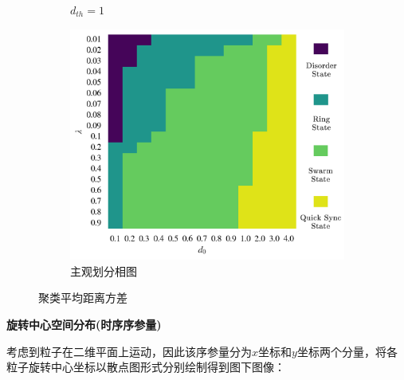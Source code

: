 \documentclass{article}
\begin{document}
\begin{figure}[H]
\begin{subfigure}[b]{0.49\textwidth}
		\vspace{-1cm}
		\caption{$d_{th}=1$}
	\end{subfigure}
	\begin{subfigure}[b]{0.49\textwidth}
		\includegraphics[width=\textwidth]{./figs/subjectiveOp.png}
		\vspace{-1cm}
		\caption{主观划分相图}
	\end{subfigure}

	\vspace{-0.5cm}
	\caption{聚类平均距离方差}
	\label{fig:fig234c.8}
\end{figure}

\newpage
\noindent\textbf{旋转中心空间分布(时序序参量)}

考虑到粒子在二维平面上运动，因此该序参量分为$x$坐标和$y$坐标两个分量，将各粒子旋转中心坐标以散点图形式分别绘制得到图下图像：
\end{document}
